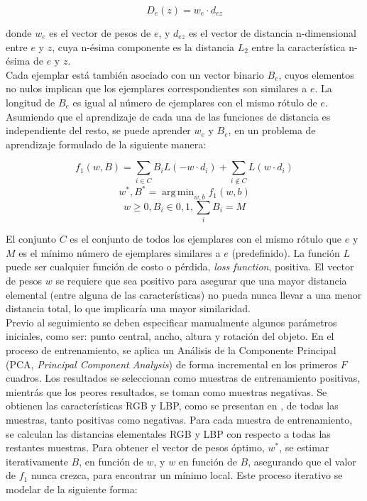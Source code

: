 \documentclass[a4paper,10pt]{article}
\DeclareMathOperator*{\argmin}{arg\,min}
\begin{document}
\begin{equation}
    \label{eq:distance-exemplar}
    D_{e}(z) = w_{e} \cdot d_{ez}
\end{equation}

donde $w_{e}$ es el vector de pesos de $e$, y $d_{ez}$ es el vector de distancia 
n-dimensional entre $e$ y $z$, cuya n-ésima componente es la distancia $L_{2}$ 
entre la característica n-ésima de $e$ y $z$.\\
Cada ejemplar está también asociado con un vector binario $B_{e}$, cuyos elementos 
no nulos implican que los ejemplares correspondientes son similares a $e$. La 
longitud de $B_{e}$ es igual al número de ejemplares con el mismo rótulo de $e$.
Asumiendo que el aprendizaje de cada una de las funciones de distancia es 
independiente del resto, se puede aprender $w_{e}$ y $B_{e}$, en un problema 
de aprendizaje formulado de la siguiente manera:

\begin{equation}
    \label{eq:learning-problem}
    f_{1}(w,B) = \sum_{i \in C} B_{i}L(-w \cdot d_{i}) + \sum_{i\notin C}L(w \cdot d_{i})
\end{equation}
\begin{equation}
    {w^{*}, B^{*} = \argmin_{w,b} f_{1} (w,b) }
\end{equation}
\begin{equation}
   w \geq 0, B_{i} \in {0,1}, \sum_{i} B_{i} = M
\end{equation}

El conjunto $C$ es el conjunto de todos los ejemplares con el mismo rótulo que $e$ y $M$ 
es el mínimo número de ejemplares similares a $e$ (predefinido). La función $L$ puede ser
cualquier función de costo o pérdida, \textit{loss function}, positiva.
El vector de pesos $w$
se requiere que sea positivo para asegurar que una mayor distancia elemental (entre 
alguna de las características) no pueda nunca llevar a una menor distancia total, 
lo que implicaría una mayor similaridad.\\

Previo al seguimiento se deben especificar manualmente algunos parámetros iniciales, 
como ser: punto central, ancho, altura y rotación del objeto. En el proceso de 
entrenamiento, se aplica un Análisis de la Componente Principal (PCA, 
\textit{Principal Component Analysis}) de forma incremental en los primeros $F$ cuadros.
Los resultados se seleccionan como muestras de entrenamiento positivas, mientrás que
los peores resultados, se toman como muestras negativas. Se obtienen las características 
RGB y LBP, como se presentan en \cite{tracking-bag-of-features}, de todas las muestras, 
tanto positivas como negativas. Para cada muestra de entrenamiento, se calculan las 
distancias elementales RGB y LBP con respecto a todas las restantes muestras.
Para obtener el vector de pesos óptimo, $w^{*}$, se estimar iterativamente $B$, 
en función de $w$, y $w$ en función de $B$, asegurando que el valor de $f_{1}$ nunca 
crezca, para encontrar un mínimo local. Este proceso iterativo se modelar de la 
siguiente forma:
\end{document}
